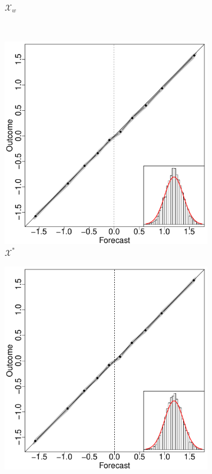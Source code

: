 \documentclass[11pt]{article}
\theoremstyle{definition}
\theoremstyle{definition}
\begin{document}
\begin{figure}[t!]
\begin{subfigure}[b]{0.241\textwidth}
                \caption{$\mathcal{X}_w$}
        \label{RelOWANo}
        \end{subfigure}
        ~ %
        \begin{subfigure}[b]{0.241\textwidth}
                \includegraphics[width=\textwidth]{SimIndepELOP.pdf}
                \caption{$\mathcal{X}^*$ }
        \label{ELOPNoOverlap}
        \end{subfigure}
                \begin{subfigure}[b]{0.241\textwidth}
                \includegraphics[width=\textwidth]{SimIndepOPT.pdf}

\end{subfigure}
\end{figure}
\end{document}
